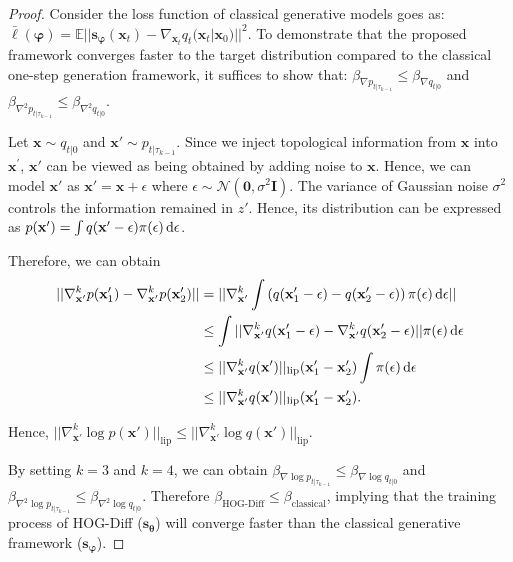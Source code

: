\begin{proof}
%
Consider the loss function of classical generative models goes as: $\bar{\ell}(\bm{\varphi}) = \mathbb{E} ||\bm{s}_{\bm{\varphi}}(\mathbf{x}_t) - \nabla_{\mathbf{x}_t} q_t(\mathbf{x}_t|\mathbf{x}_0)||^2$.
To demonstrate that the proposed framework converges faster to the target distribution compared to the classical one-step generation framework, it suffices to show that: $\beta_{\nabla p_{t|\tau_{k-1}}} \leq \beta_{\nabla q_{t|0}}$ and $\beta_{\nabla^2 p_{t|\tau_{k-1}}} \leq \beta_{\nabla^2 q_{t|0}}$.

Let $\mathbf{x}\sim q_{t|0}$ and $\mathbf{x}'\sim p_{t|\tau_{k-1}}$. Since we inject topological information from $\mathbf{x}$ into $\mathbf{x}^{\prime}$, $\mathbf{x}'$ can be viewed as being obtained by adding noise to $\mathbf{x}$. Hence, we can model $\mathbf{x}'$ as $\mathbf{x}' = \mathbf{x} + \epsilon$ where $\epsilon \sim \mathcal{N}(\mathbf{0},\sigma^2 \bm{I})$. The variance of Gaussian noise $\sigma^2$ controls the information remained in $z'$. 
Hence, its distribution can be expressed as $p(\mathbf{x}')=\int q(\mathbf{x}'-\epsilon)\pi(\epsilon)\mathop{}\!\mathrm{d}\epsilon$.

Therefore, we can obtain
\begin{equation}
\begin{split}
||\nabla_{\mathbf{x}'}^k p(\mathbf{x}'_1) - \nabla_{\mathbf{x}'}^k p(\mathbf{x}'_2)||
& =|| \nabla_{\mathbf{x}'}^k \int \left(q(\mathbf{x}_1'-\epsilon)-q(\mathbf{x}_2'-\epsilon)\right)\pi(\epsilon)\diff{\epsilon}||\\
&\leq  \int ||\nabla_{\mathbf{x}'}^k q(\mathbf{x}_1'-\epsilon) - \nabla_{\mathbf{x}'}^k q(\mathbf{x}_2'-\epsilon)|| \pi(\epsilon)\diff{\epsilon} \\ %
& \leq ||\nabla_{\mathbf{x}'}^k q(\mathbf{x}') ||_{\mathrm{lip}} (\mathbf{x}_1'-\mathbf{x}_2')  \int \pi(\epsilon)\diff{\epsilon}\\
& \leq ||\nabla_{\mathbf{x}'}^k q(\mathbf{x}') ||_{\mathrm{lip}} (\mathbf{x}_1'-\mathbf{x}_2').
\end{split}
\end{equation}


Hence, $||\nabla_{\mathbf{x}'}^k \log p(\mathbf{x}')||_{\mathrm{lip}} \leq ||\nabla_{\mathbf{x}'}^k \log q(\mathbf{x}')||_{\mathrm{lip}}$.

By setting $k=3$ and $k=4$, we can obtain $\beta_{\nabla \log p_{t|\tau_{k-1}}} \leq \beta_{\nabla \log q_{t|0}}$ and $\beta_{\nabla^2 \log p_{t|\tau_{k-1}}} \leq \beta_{\nabla^2 \log q_{t|0}}$. 
Therefore $\beta_{\text{HOG-Diff}}\leq \beta_{\text{classical}}$, implying that the training process of HOG-Diff ($\bm{s}_{\bm{\theta}}$) will converge faster than the classical generative framework ($\bm{s}_{\bm{\varphi}}$).

\end{proof}








